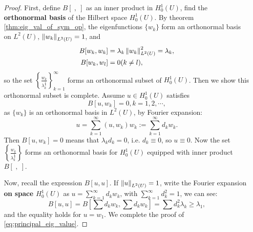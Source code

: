 \begin{proof}
    First, define $B[\;,\;]$ as an inner product in $H_{0}^{1}(U)$, find the \textbf{orthonormal basis} of the Hilbert space $H_{0}^{1}(U)$. By theorem \ref{thm:eig_val_of_sym_op}, the eigenfunctions $\{w_{k}\}$ form an orthonormal basis on $L^{2}(U)$, $\left\|w_{k}\right\|_{L^{2}(U)}=1$, and 
    \begin{equation}
        \begin{aligned}
        B[w_{k},w_{k}]&=\lambda_{k}\left\|w_{k}\right\|_{L^{2}(U)}^{2}=\lambda_{k},\\
        B[w_{k},w_{l}]&=0(k\neq l),\\
        \end{aligned}
    \end{equation}
    so the set $\left\{\frac{w_{k}}{\lambda_{k}^{\frac{1}{2}}}\right\}_{k=1}^{\infty}$ forms an orthonormal subset of $H_{0}^{1}(U)$. Then we show this orthonormal subset is complete. Assume $u\in H_{0}^{1}(U)$ satisfies
    \begin{equation}
        B[u,w_{k}]=0,k=1,2,\cdots,
    \end{equation}
    as $\{w_{k}\}$ is an orthonormal basis in $L^{2}(U)$, by Fourier expansion:
    \begin{equation}
        u=\sum_{k=1}^{\infty}(u,w_{k})w_{k}:=\sum_{k=1}^{\infty}d_{k}w_{k}.
    \end{equation}
    Then $B[u,w_{k}]=0$ means that $\lambda_{k}d_{k}=0$, i.e. $d_{k}\equiv 0$, so $u\equiv 0$. Now the set $\left\{\frac{w_{k}}{\lambda_{k}^{\frac{1}{2}}}\right\}$ forms an orthonormal basis for $H_{0}^{1}(U)$ equipped with inner product $B[\;,\;]$.

    Now, recall the expression $B[u,u]$. If $\left\|u\right\|_{L^{2}(U)}=1$, write the Fourier expansion \textbf{on space $H_{0}^{1}(U)$} as $u=\sum_{k=1}^{\infty} d_{k}w_{k}$, with $\sum_{k=1}^{\infty} d_{k}^{2}=1$, we can see:
    \begin{equation}
        B[u,u]=B[\sum d_{k}w_{k},\sum d_{k}w_{k}]=\sum d_{k}^{2}\lambda_{k}\ge\lambda_{1},
    \end{equation}
    and the equality holds for $u=w_{1}$. We complete the proof of \eqref{eq:principal_eig_value}. 


\end{proof}
